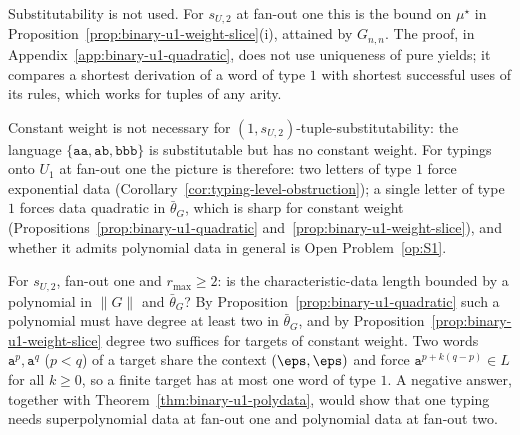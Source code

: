 Substitutability is not used.  For $s_{U,2}$ at fan-out one this is the bound on
$\mu^\star$ in Proposition~\ref{prop:binary-u1-weight-slice}(i), attained by
$G_{n,n}$.  The proof, in Appendix~\ref{app:binary-u1-quadratic}, does not use
uniqueness of pure yields; it compares a shortest derivation of a word of type
$1$ with shortest successful uses of its rules, which works for tuples of any
arity.

Constant weight is not necessary for $(1,s_{U,2})$-tuple-substitutability: the
language $\{\mathtt{aa},\mathtt{ab},\mathtt{bbb}\}$ is substitutable but has no
constant weight.  For typings onto $U_1$ at fan-out one the picture is
therefore: two letters of type $1$ force exponential data
(Corollary~\ref{cor:typing-level-obstruction}); a single letter of type $1$
forces data quadratic in $\bar\theta_G$, which is sharp for constant weight
(Propositions~\ref{prop:binary-u1-quadratic}
and~\ref{prop:binary-u1-weight-slice}), and whether it admits polynomial data
in general is Open Problem~\ref{op:S1}.

\begin{openproblem}
\label{op:S1}
For $s_{U,2}$, fan-out one and $r_{\max}\ge2$: is the characteristic-data length
bounded by a polynomial in $\|G\|$ and $\bar\theta_G$?  By
Proposition~\ref{prop:binary-u1-quadratic} such a polynomial must have degree at
least two in $\bar\theta_G$, and by Proposition~\ref{prop:binary-u1-weight-slice}
degree two suffices for targets of constant weight.  Two words
$\mathtt a^p,\mathtt a^q$ ($p<q$) of a target share the context $(\eps,\eps)$ and
force $\mathtt a^{p+k(q-p)}\in L$ for all $k\ge0$, so a finite target has at most
one word of type $1$.  A negative answer, together
with Theorem~\ref{thm:binary-u1-polydata}, would show that one typing needs
superpolynomial data at fan-out one and polynomial data at fan-out two.
\end{openproblem}

